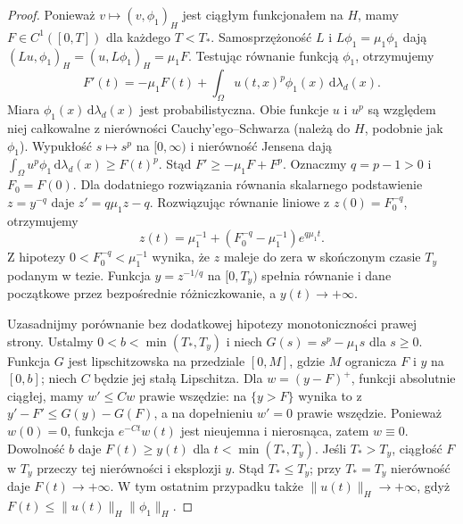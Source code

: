 \begin{proof}
Ponieważ $v\mapsto(v,\phi_1)_H$ jest ciągłym
funkcjonałem na $H$, mamy $F\in C^1([0,T])$
dla każdego $T<T_*$. Samosprzężoność $L$ i
$L\phi_1=\mu_1\phi_1$ dają
$(Lu,\phi_1)_H=(u,L\phi_1)_H=\mu_1F$.
Testując równanie funkcją $\phi_1$, otrzymujemy
\[
 F'(t)=-\mu_1F(t)+\int_\Omega u(t,x)^p\phi_1(x)
 \,\mathrm d\lambda_d(x).
\]
Miara $\phi_1(x)\,\mathrm d\lambda_d(x)$ jest probabilistyczna.
Obie funkcje $u$ i $u^p$ są względem niej całkowalne
z nierówności Cauchy'ego--Schwarza (należą do $H$,
podobnie jak $\phi_1$). Wypukłość $s\mapsto s^p$
na $[0,\infty)$ i nierówność Jensena dają
$\int_\Omega u^p\phi_1\,\mathrm d\lambda_d(x)\ge F(t)^p$.
Stąd $F'\ge-\mu_1F+F^p$.
Oznaczmy $q=p-1>0$ i $F_0=F(0)$.
Dla dodatniego rozwiązania równania skalarnego
podstawienie $z=y^{-q}$ daje $z'=q\mu_1z-q$.
Rozwiązując równanie liniowe z $z(0)=F_0^{-q}$,
otrzymujemy
\[
 z(t)=\mu_1^{-1}+
 (F_0^{-q}-\mu_1^{-1})e^{q\mu_1t}.
\]
Z hipotezy $0<F_0^{-q}<\mu_1^{-1}$ wynika,
że $z$ maleje do zera w skończonym czasie $T_y$
podanym w tezie. Funkcja $y=z^{-1/q}$ na $[0,T_y)$
spełnia równanie i dane początkowe przez bezpośrednie
różniczkowanie, a $y(t)\to+\infty$.

Uzasadnijmy porównanie bez dodatkowej hipotezy
monotoniczności prawej strony. Ustalmy
$0<b<\min(T_*,T_y)$ i niech $G(s)=s^p-\mu_1s$ dla
$s\ge0$. Funkcja $G$ jest lipschitzowska na
przedziale $[0,M]$, gdzie $M$ ogranicza $F$ i $y$
na $[0,b]$; niech $C$ będzie jej stałą Lipschitza.
Dla $w=(y-F)^+$, funkcji absolutnie ciągłej, mamy
$w'\le Cw$ prawie wszędzie: na $\{y>F\}$ wynika to
z $y'-F'\le G(y)-G(F)$, a na dopełnieniu $w'=0$
prawie wszędzie. Ponieważ $w(0)=0$, funkcja
$e^{-Ct}w(t)$ jest nieujemna i nierosnąca, zatem
$w\equiv0$. Dowolność $b$ daje $F(t)\ge y(t)$
dla $t<\min(T_*,T_y)$.
Jeśli $T_*>T_y$, ciągłość $F$ w $T_y$ przeczy
tej nierówności i eksplozji $y$. Stąd $T_*\le T_y$;
przy $T_*=T_y$ nierówność daje $F(t)\to+\infty$.
W tym ostatnim przypadku także
$\|u(t)\|_H\to+\infty$, gdyż
$F(t)\le\|u(t)\|_H\|\phi_1\|_H$.
\end{proof}

